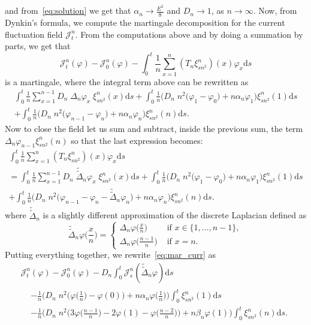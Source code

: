 \documentclass[AHL,Unicode,longabstracts]{cedram}
\newcommand{\mc}[1]{{\mathcal #1}}
\renewcommand{\mc}[1]{{\mathcal #1}}
\renewcommand{\tilde}{\widetilde}
\newcommand*{\dd}{\mathrm{d}}
\newcommand*{\ds}{\dd s}
\renewcommand{\tfrac}{\frac}
\begin{document}
and from~\eqref{eq:solution} we get that $\alpha_n \to \frac{E^2}{8}$ {and $D_n\to 1$}, as $n\to\infty$. Now, from Dynkin's formula, we compute the martingale decomposition for the current fluctuation field $\mc J_t^n$. From the computations above and by doing a summation by parts, we get that
\begin{equation}\label{eq:mar_curr}
\mc J_t^n(\varphi) - \mc J_0^n(\varphi) -\int_{0}^t
\frac1n \sum_{x=1}^n (T_n \xi_{{sn^2}}^n)(x) \varphi_x \ds
\end{equation}
is a martingale, where the integral term above can be rewritten as
\begin{multline*}
\int_0^t \frac{1}{n} \sum_{x=1}^{n-1} {D_n}\; {\Delta}_n\varphi_x \; \xi_{{sn^2}}^n(x) \ds +\int_0^t\frac 1n \Big({D_n\; n^2}\big(\varphi_1 - \varphi_0\big) + n\alpha_n \varphi_1\Big) \xi_{{sn^2}}^n(1) \ds \\
+\int_0^t\frac 1n \Big({D_n\; n^2} \big(\varphi_{n-1} - \varphi_{n}\big) + n{\alpha_n} \varphi_n\Big) \xi_{{sn^2}}^n(n)\ds.
\end{multline*}
Now to close the field let us sum and subtract, inside the previous sum, the term $\Delta_n \varphi_{n-1} \xi_{sn^2}^n(n)$ so that the last expression becomes:
\begin{multline*}
\int_0^t
\frac1n \sum_{x=1}^n (T_n \xi_{{sn^2}}^n)(x) \varphi_x \ds \\ =\int_0^t \frac{1}{n} \sum_{x=1}^{n-1} {D_n} \; \tilde{\tilde\Delta}_n\varphi_x \; \xi_{{sn^2}}^n(x) \ds +\int_0^t\frac 1n \Big({D_n\; n^2}\big(\varphi_1 - \varphi_0\big) + n\alpha_n \varphi_1\Big) \xi_{{sn^2}}^n(1)\ds\\
+\int_0^t\frac 1n \Big({D_n\; n^2} \big(\varphi_{n-1} - \varphi_{n}-\tilde{\tilde\Delta}_n\varphi_n \big) +n{\alpha_n} \varphi_n\Big) \xi_{{sn^2}}^n(n) \ds.
\end{multline*}
where $\tilde{\tilde\Delta}_n$ is a slightly different approximation of the discrete Laplacian defined as
\begin{equation}\label{eq:lap3}
\tilde{\tilde\Delta}_n\varphi\big(\tfrac x n\big) =
\begin{cases}
\Delta_n\varphi\big(\tfrac x n\big) & \text{ if } x \in\{1,\dots,n-1\},\\
\Delta_n\varphi\big(\tfrac {n-1} n\big) & \text{ if } x = n.
\end{cases}
\end{equation}
Putting everything together, we rewrite~\eqref{eq:mar_curr} as
\begin{multline}
\mc J_t^n(\varphi)-\mc J_0^n(\varphi) - D_n \int_0^t \mc J_s^n(\tilde{\tilde\Delta}_n\varphi)\ds \\
\begin{aligned}
&- \frac 1n\Big({D_n\; n^2}\Big(\varphi\Big(\tfrac 1n\Big)-\varphi(0)\big)+ n\alpha_n\varphi\Big(\tfrac1n\Big)\Big)\int_0^t \xi_{{sn^2}}^n(1) \ds \\
& - \frac 1n\Big({D_n\; n^2} \Big(3\varphi\Big(\tfrac{n-1}{n}\Big)-2\varphi(1)-\varphi\Big(\tfrac{n-2}{n}\Big)\Big)+n\beta_n\varphi(1)\Big) \int_0^t \xi_{{sn^2}}^n(n) \ds. \label{eq:CH2}
\end{aligned}
\end{multline}
\end{document}

